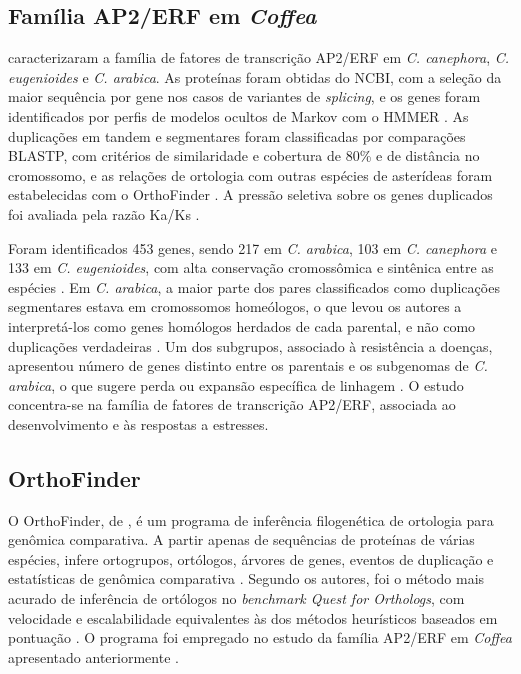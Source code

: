 \subsection{Família AP2/ERF em \textit{Coffea}}

 caracterizaram a família de fatores de transcrição AP2/ERF em \textit{C. canephora}, \textit{C. eugenioides} e \textit{C. arabica}. As proteínas foram obtidas do NCBI, com a seleção da maior sequência por gene nos casos de variantes de \textit{splicing}, e os genes foram identificados por perfis de modelos ocultos de Markov com o HMMER \cite{Park2025}. As duplicações em tandem e segmentares foram classificadas por comparações BLASTP, com critérios de similaridade e cobertura de 80\% e de distância no cromossomo, e as relações de ortologia com outras espécies de asterídeas foram estabelecidas com o OrthoFinder \cite{Park2025}. A pressão seletiva sobre os genes duplicados foi avaliada pela razão Ka/Ks \cite{Park2025}.

Foram identificados 453 genes, sendo 217 em \textit{C. arabica}, 103 em \textit{C. canephora} e 133 em \textit{C. eugenioides}, com alta conservação cromossômica e sintênica entre as espécies \cite{Park2025}. Em \textit{C. arabica}, a maior parte dos pares classificados como duplicações segmentares estava em cromossomos homeólogos, o que levou os autores a interpretá-los como genes homólogos herdados de cada parental, e não como duplicações verdadeiras \cite{Park2025}. Um dos subgrupos, associado à resistência a doenças, apresentou número de genes distinto entre os parentais e os subgenomas de \textit{C. arabica}, o que sugere perda ou expansão específica de linhagem \cite{Park2025}. O estudo concentra-se na família de fatores de transcrição AP2/ERF, associada ao desenvolvimento e às respostas a estresses.

\subsection{OrthoFinder}

O OrthoFinder, de , é um programa de inferência filogenética de ortologia para genômica comparativa. A partir apenas de sequências de proteínas de várias espécies, infere ortogrupos, ortólogos, árvores de genes, eventos de duplicação e estatísticas de genômica comparativa \cite{EmmsKelly2019}. Segundo os autores, foi o método mais acurado de inferência de ortólogos no \textit{benchmark Quest for Orthologs}, com velocidade e escalabilidade equivalentes às dos métodos heurísticos baseados em pontuação \cite{EmmsKelly2019}. O programa foi empregado no estudo da família AP2/ERF em \textit{Coffea} apresentado anteriormente \cite{Park2025}.

